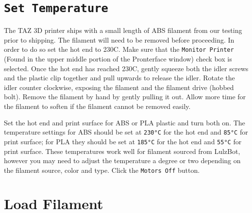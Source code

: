 \section{\texttt{Set Temperature}}
The TAZ 3D printer ships with a small length of ABS filament from our testing prior to shipping. The filament will need to be removed before proceeding. In order to do so set the hot end to 230C. Make sure that the \texttt{Monitor Printer} (Found in the upper middle portion of the Pronterface window) check box is selected. Once the hot end has reached 230C, gently squeeze both the idler screws and the plastic clip together and pull upwards to release the idler. Rotate the idler counter clockwise, exposing the filament and the filament drive (hobbed bolt). Remove the filament by hand by gently pulling it out. Allow more time for the filament to soften if the filament cannot be removed easily.

Set the hot end and print surface for ABS or PLA plastic and turn both on. The temperature settings for ABS should be set at \texttt{230°C} for the hot end and \texttt{85°C} for print surface; for PLA they should be set at \texttt{185°C} for the hot end and \texttt{55°C} for print surface. These temperatures work well for filament sourced from LulzBot, however you may need to adjust the temperature a degree or two depending on the filament source, color and type. Click the \texttt{Motors Off} button.
\section{Load Filament}

